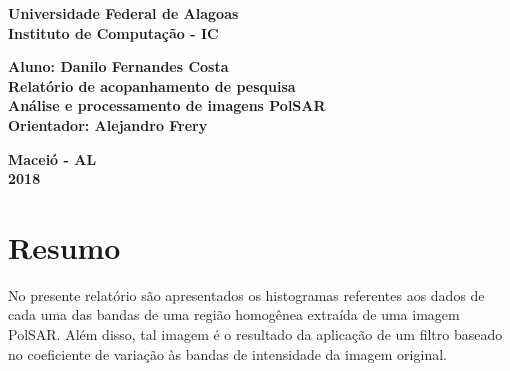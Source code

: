 \documentclass[12pt]{article}
\begin{document}
\begin{titlepage}
\begin{center}

\textbf{\LARGE Universidade Federal de Alagoas } \\[0.5cm]
\textbf{\large Instituto de Computação - IC}\\[0.2cm]

\vspace{20pt}

\vspace{20pt}
\vspace{20pt}
\vspace{20pt}
\vspace{20pt}
\vspace{20pt}
\vspace{20pt}
\vspace{20pt}
\vspace{20pt}

\textbf{\Large Aluno: Danilo Fernandes Costa}\\
\vspace{70pt}
\textbf{\LARGE Relatório de acopanhamento de pesquisa}\\
\vspace{20pt}
\textbf{\Large Análise e processamento de imagens PolSAR}\\
\vspace{70pt}
\textbf{\large Orientador: Alejandro Frery}\\

\vspace{45pt}
\end{center}

\par
\vfill
\begin{center}
\textbf{Maceió - AL}\\
\textbf{2018}
\end{center}

\end{titlepage}

\newpage

\section{Resumo}

No presente relatório são apresentados os histogramas referentes aos dados de cada uma das bandas de uma região homogênea extraída de uma imagem PolSAR. 
Além disso, tal imagem é o resultado da aplicação de um filtro baseado no coeficiente de variação às bandas de intensidade da imagem original.  
\end{document}

